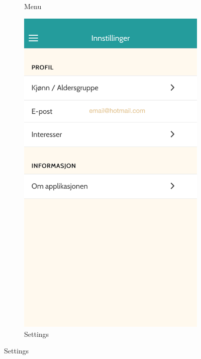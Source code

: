 \begin{appendices}
\begin{figure}[h!]
\begin{subfigure}[h]{0.3\textwidth}
			\caption{Menu}
		\end{subfigure}
		\hspace{1cm}
		\begin{subfigure}[h]{0.3\textwidth}
			\includegraphics[width=\textwidth]{fig/screenshot_settings}
			\caption{Settings}
		\end{subfigure}
		\label{fig:other}
	\end{figure}

\end{appendices}
\cleardoublepage